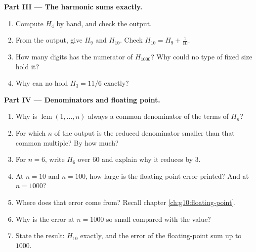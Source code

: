 \begin{problem}
\medskip\noindent\textbf{Part III --- The harmonic sums exactly.}
\begin{enumerate}[resume]
  \item Compute $H_4$ by hand, and check the output.
  \item From the output, give $H_9$ and $H_{10}$. Check $H_{10} = H_9 + \frac{1}{10}$.
  \item How many digits has the numerator of $H_{1000}$? Why could no type of fixed size hold it?
  \item Why can no  hold $H_3 = 11/6$ exactly?
\end{enumerate}

\medskip\noindent\textbf{Part IV --- Denominators and floating point.}
\begin{enumerate}[resume]
  \item Why is $\operatorname{lcm}(1, \dots, n)$ always a common denominator of the terms of $H_n$?
  \item For which $n$ of the output is the reduced denominator smaller than that common multiple? By how much?
  \item For $n = 6$, write $H_6$ over $60$ and explain why it reduces by $3$.
  \item At $n = 10$ and $n = 100$, how large is the floating-point error printed? And at $n = 1000$?
  \item Where does that error come from? Recall chapter \ref{ch:g10:floating-point}.
  \item Why is the error at $n = 1000$ so small compared with the value?
  \item State the result: $H_{10}$ exactly, and the error of the floating-point sum up to $1000$.
\end{enumerate}
\end{problem}
